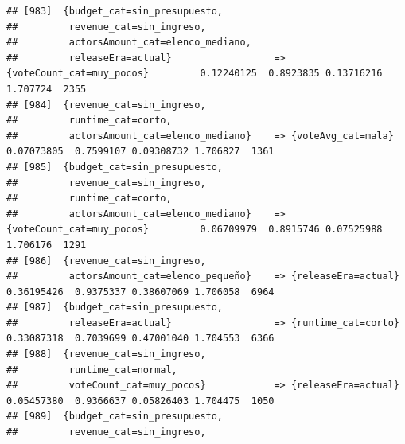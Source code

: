\documentclass[
]{article}
\begin{document}
\begin{verbatim}
## [983]  {budget_cat=sin_presupuesto,                                                                                             
##         revenue_cat=sin_ingreso,                                                                                                
##         actorsAmount_cat=elenco_mediano,                                                                                        
##         releaseEra=actual}                  => {voteCount_cat=muy_pocos}         0.12240125  0.8923835 0.13716216 1.707724  2355
## [984]  {revenue_cat=sin_ingreso,                                                                                                
##         runtime_cat=corto,                                                                                                      
##         actorsAmount_cat=elenco_mediano}    => {voteAvg_cat=mala}                0.07073805  0.7599107 0.09308732 1.706827  1361
## [985]  {budget_cat=sin_presupuesto,                                                                                             
##         revenue_cat=sin_ingreso,                                                                                                
##         runtime_cat=corto,                                                                                                      
##         actorsAmount_cat=elenco_mediano}    => {voteCount_cat=muy_pocos}         0.06709979  0.8915746 0.07525988 1.706176  1291
## [986]  {revenue_cat=sin_ingreso,                                                                                                
##         actorsAmount_cat=elenco_pequeño}    => {releaseEra=actual}               0.36195426  0.9375337 0.38607069 1.706058  6964
## [987]  {budget_cat=sin_presupuesto,                                                                                             
##         releaseEra=actual}                  => {runtime_cat=corto}               0.33087318  0.7039699 0.47001040 1.704553  6366
## [988]  {revenue_cat=sin_ingreso,                                                                                                
##         runtime_cat=normal,                                                                                                     
##         voteCount_cat=muy_pocos}            => {releaseEra=actual}               0.05457380  0.9366637 0.05826403 1.704475  1050
## [989]  {budget_cat=sin_presupuesto,                                                                                             
##         revenue_cat=sin_ingreso,                                                                                                

\end{verbatim}
\end{document}
